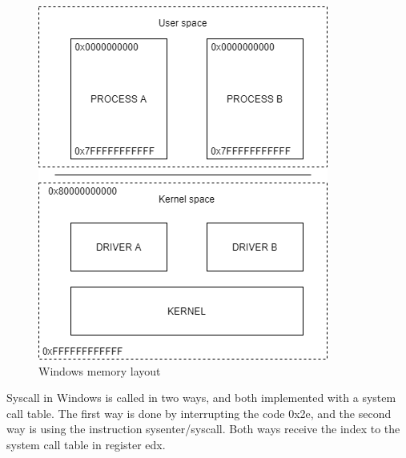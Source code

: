 \begin{figure}[h]
  \centering
  \caption{Windows memory layout}
  \label{fig:winimplement}
  \includegraphics[scale=0.7]{images/winimplement.png}
\end{figure}

Syscall in Windows is called in two ways, and both implemented with a system
call table. The first way is done by interrupting the code 0x2e, and the second
way is using the instruction sysenter/syscall. Both ways receive the index to
the system call table in register edx.
